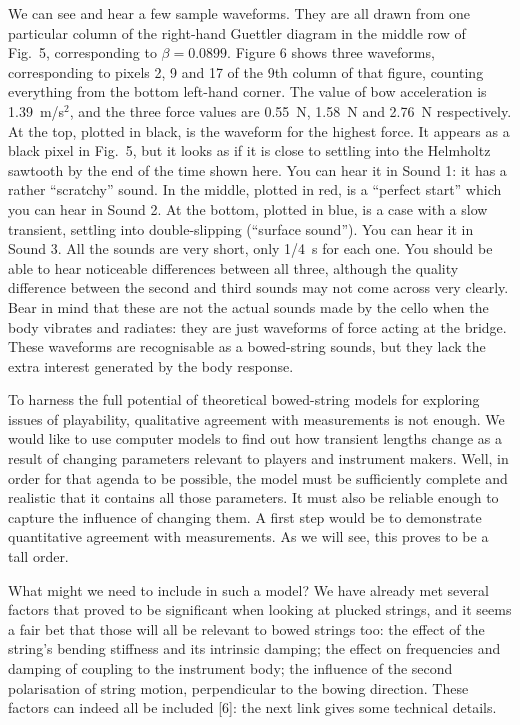   We can see and hear a few sample waveforms. They are all drawn from one 
  particular column of the right-hand Guettler diagram in the middle row of 
  Fig.\ 5, corresponding to $\beta=0.0899$. Figure 6 shows three waveforms, 
  corresponding to pixels 2, 9 and 17 of the 9th column of that figure, 
  counting everything from the bottom left-hand corner. The value of bow 
  acceleration is 1.39~m/s$^2$, and the three force values are 0.55~N, 1.58~N 
  and 2.76~N respectively. At the top, plotted in black, is the waveform for 
  the highest force. It appears as a black pixel in Fig.\ 5, but it looks as if 
  it is close to settling into the Helmholtz sawtooth by the end of the time 
  shown here. You can hear it in Sound 1: it has a rather ``scratchy'' sound. 
  In the middle, plotted in red, is a ``perfect start'' which you can hear in 
  Sound 2. At the bottom, plotted in blue, is a case with a slow transient, 
  settling into double-slipping (``surface sound''). You can hear it in Sound 
  3. All the sounds are very short, only 1/4~s for each one. You should be able 
  to hear noticeable differences between all three, although the quality 
  difference between the second and third sounds may not come across very 
  clearly. Bear in mind that these are not the actual sounds made by the cello 
  when the body vibrates and radiates: they are just waveforms of force acting 
  at the bridge. These waveforms are recognisable as a bowed-string sounds, but 
  they lack the extra interest generated by the body response. 

  To harness the full potential of theoretical bowed-string models for 
  exploring issues of playability, qualitative agreement with measurements is 
  not enough. We would like to use computer models to find out how transient 
  lengths change as a result of changing parameters relevant to players and 
  instrument makers. Well, in order for that agenda to be possible, the model 
  must be sufficiently complete and realistic that it contains all those 
  parameters. It must also be reliable enough to capture the influence of 
  changing them. A first step would be to demonstrate quantitative agreement 
  with measurements. As we will see, this proves to be a tall order. 

  What might we need to include in such a model? We have already met several 
  factors that proved to be significant when looking at plucked strings, and it 
  seems a fair bet that those will all be relevant to bowed strings too: the 
  effect of the string’s bending stiffness and its intrinsic damping; the 
  effect on frequencies and damping of coupling to the instrument body; the 
  influence of the second polarisation of string motion, perpendicular to the 
  bowing direction. These factors can indeed all be included [6]: the next link 
  gives some technical details. 

